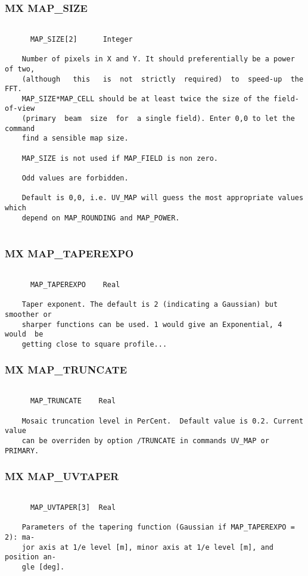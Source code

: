 \subsubsection{MX MAP\_SIZE}
\begin{verbatim}

      MAP_SIZE[2]      Integer

    Number of pixels in X and Y. It should preferentially be a power of two,
    (although   this   is  not  strictly  required)  to  speed-up  the  FFT.
    MAP_SIZE*MAP_CELL should be at least twice the size of the field-of-view
    (primary  beam  size  for  a single field). Enter 0,0 to let the command
    find a sensible map size.

    MAP_SIZE is not used if MAP_FIELD is non zero.

    Odd values are forbidden.

    Default is 0,0, i.e. UV_MAP will guess the most appropriate values which
    depend on MAP_ROUNDING and MAP_POWER.


\end{verbatim}
\subsubsection{MX MAP\_TAPEREXPO}
\begin{verbatim}

      MAP_TAPEREXPO    Real

    Taper exponent. The default is 2 (indicating a Gaussian) but smoother or
    sharper functions can be used. 1 would give an Exponential, 4  would  be
    getting close to square profile...

\end{verbatim}
\subsubsection{MX MAP\_TRUNCATE}
\begin{verbatim}

      MAP_TRUNCATE    Real

    Mosaic truncation level in PerCent.  Default value is 0.2. Current value
    can be overriden by option /TRUNCATE in commands UV_MAP or PRIMARY.

\end{verbatim}
\subsubsection{MX MAP\_UVTAPER}
\begin{verbatim}

      MAP_UVTAPER[3]  Real

    Parameters of the tapering function (Gaussian if MAP_TAPEREXPO = 2): ma-
    jor axis at 1/e level [m], minor axis at 1/e level [m], and position an-
    gle [deg].

\end{verbatim}
